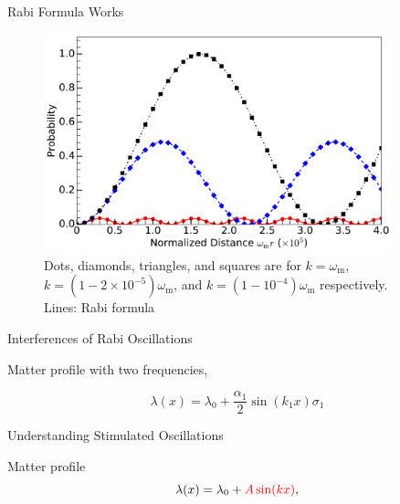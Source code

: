 \documentclass[9pt]{beamer}
\begin{document}
\begin{darkframes}
\begin{frame}{Rabi Formula Works}
\begin{figure}
\includegraphics[width=0.9\textwidth]{assets/rabiOscillationsNeutrinoCoincidence-single-frequency}
\caption*{
Dots, diamonds, triangles, and squares are for $k=\omega_{\mathrm m}$, $k=(1-2\times 10^{-5})\omega_{\mathrm m}$, and $k=(1-10^{-4})\omega_{\mathrm m}$ respectively.\\
Lines: Rabi formula
}
\end{figure}


\end{frame}






\begin{frame}{Interferences of Rabi Oscillations}

Matter profile with two frequencies,

\begin{equation*}
    \lambda(x) = \lambda_0  + \frac{\alpha_1}{2}\sin(k_1 x) \sigma_1
\end{equation*}

\end{frame}







\begin{frame}{Understanding Stimulated Oscillations}


Matter profile
\begin{equation*}
    \lambda(x) = \lambda_0 + {\color{red}A \sin (k x)},
\end{equation*}



\end{frame}
\end{darkframes}
\end{document}
